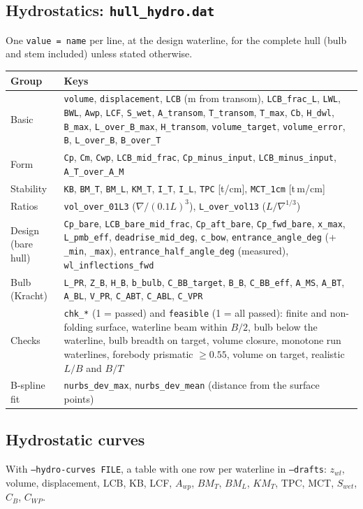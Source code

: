 \documentclass[11pt,a4paper]{article}
\newcommand{\cmd}[1]{\texttt{#1}}
\begin{document}
\subsection{Hydrostatics: \cmd{hull\_hydro.dat}}
One \cmd{value = name} per line, at the design waterline, for the complete hull (bulb and stem
included) unless stated otherwise.
\begin{longtable}{L{3.0cm}L{12.3cm}}
\toprule
Group & Keys \\ \midrule
Basic & \cmd{volume}, \cmd{displacement}, \cmd{LCB} (m from transom), \cmd{LCB\_frac\_L},
\cmd{LWL}, \cmd{BWL}, \cmd{Awp}, \cmd{LCF}, \cmd{S\_wet}, \cmd{A\_transom}, \cmd{T\_transom},
\cmd{T\_max}, \cmd{Cb}, \cmd{H\_dwl}, \cmd{B\_max}, \cmd{L\_over\_B\_max}, \cmd{H\_transom},
\cmd{volume\_target}, \cmd{volume\_error}, \cmd{B}, \cmd{L\_over\_B}, \cmd{B\_over\_T} \\
Form & \cmd{Cp}, \cmd{Cm}, \cmd{Cwp}, \cmd{LCB\_mid\_frac}, \cmd{Cp\_minus\_input},
\cmd{LCB\_minus\_input}, \cmd{A\_T\_over\_A\_M} \\
Stability & \cmd{KB}, \cmd{BM\_T}, \cmd{BM\_L}, \cmd{KM\_T}, \cmd{I\_T}, \cmd{I\_L},
\cmd{TPC} [t/cm], \cmd{MCT\_1cm} [t\,m/cm] \\
Ratios & \cmd{vol\_over\_01L3} ($\nabla/(0.1L)^3$), \cmd{L\_over\_vol13} ($L/\nabla^{1/3}$) \\
Design (bare hull) & \cmd{Cp\_bare}, \cmd{LCB\_bare\_mid\_frac}, \cmd{Cp\_aft\_bare},
\cmd{Cp\_fwd\_bare}, \cmd{x\_max}, \cmd{L\_pmb\_eff}, \cmd{deadrise\_mid\_deg}, \cmd{c\_bow},
\cmd{entrance\_angle\_deg} (+ \cmd{\_min}, \cmd{\_max}), \cmd{entrance\_half\_angle\_deg} (measured),
\cmd{wl\_inflections\_fwd} \\
Bulb (Kracht) & \cmd{L\_PR}, \cmd{Z\_B}, \cmd{H\_B}, \cmd{b\_bulb}, \cmd{C\_BB\_target},
\cmd{B\_B}, \cmd{C\_BB\_eff}, \cmd{A\_MS}, \cmd{A\_BT}, \cmd{A\_BL}, \cmd{V\_PR}, \cmd{C\_ABT},
\cmd{C\_ABL}, \cmd{C\_VPR} \\
Checks & \cmd{chk\_*} (1 = passed) and \cmd{feasible} (1 = all passed): finite and non-folding surface, waterline beam within $B/2$, bulb below the waterline, bulb breadth on target, volume closure, monotone run waterlines, forebody prismatic $\ge 0.55$, volume on target, realistic $L/B$ and $B/T$ \\
B-spline fit & \cmd{nurbs\_dev\_max}, \cmd{nurbs\_dev\_mean} (distance from the surface points) \\
\bottomrule
\end{longtable}

\subsection{Hydrostatic curves}
With \cmd{--hydro-curves FILE}, a table with one row per waterline in \cmd{--drafts}:
$z_{wl}$, volume, displacement, LCB, KB, LCF, $A_{wp}$, $BM_T$, $BM_L$, $KM_T$, TPC, MCT,
$S_{wet}$, $C_B$, $C_{WP}$.
\end{document}
